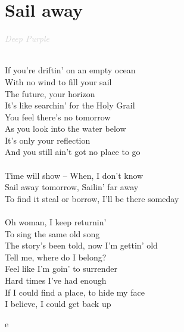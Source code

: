 \documentclass[a5paper, 10pt]{book}
\begin{document}
\newpage
\section{Sail away}\textcolor{lightgray}{\textit{Deep Purple}}\\~\\
\begin{minipage}[t]{0.8\textwidth}
If you're driftin' on an empty ocean\\
With no wind to fill your sail\\
The future, your horizon\\
It's like searchin' for the Holy Grail\\
You feel there's no tomorrow\\
As you look into the water below\\
It's only your reflection\\
And you still ain't got no place to go\\
\\
\hspace*{5mm}Time will show – When, I don't know\\
\hspace*{5mm}Sail away tomorrow, Sailin' far away\\
\hspace*{5mm}To find it steal or borrow, I'll be there someday\\
\\
Oh woman, I keep returnin'\\
To sing the same old song\\
The story's been told, now I'm gettin' old\\
Tell me, where do I belong?\\
Feel like I'm goin' to surrender\\
Hard times I've had enough\\
If I could find a place, to hide my face\\
I believe, I could get back up\\
\end{minipage}
\begin{minipage}[t]{0.2\textwidth}
e
\end{minipage}

\newpage
\end{document}
